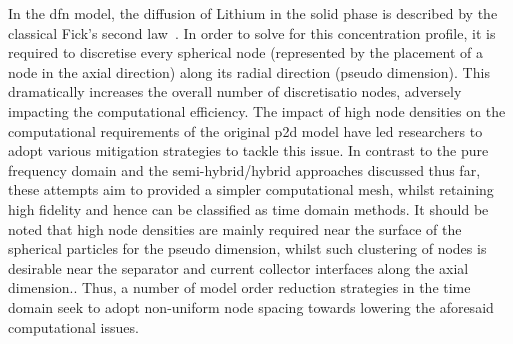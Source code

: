 In the \gls{dfn} model, the diffusion of Lithium in the solid phase is described
by the classical  Fick's second law~\cite{Fick1995}. In order to  solve for this
concentration  profile,  it  is  required to  discretise  every  spherical  node
(represented by the placement of a node in the axial direction) along its radial
direction (pseudo dimension). This dramatically  increases the overall number of
discretisatio  nodes,  adversely  impacting the  computational  efficiency.  The
impact of high node densities on  the computational requirements of the original
\gls{p2d}  model have  led researchers  to adopt  various mitigation  strategies
to  tackle  this  issue. In  contrast  to  the  pure  frequency domain  and  the
semi-hybrid/hybrid approaches discussed thus far, these attempts aim to provided
a  simpler computational  mesh, whilst  retaining  high fidelity  and hence  can
be  classified  as time  domain  methods.  It should  be  noted  that high  node
densities are  mainly required near the  surface of the spherical  particles for
the  pseudo   dimension,  whilst  such  clustering of  nodes  is
desirable near  the separator and  current collector interfaces along  the axial
dimension..  Thus, a
number  of  model  order  reduction  strategies  in  the  time  domain  seek  to
adopt  non-uniform node  spacing  towards lowering  the aforesaid  computational
issues.


